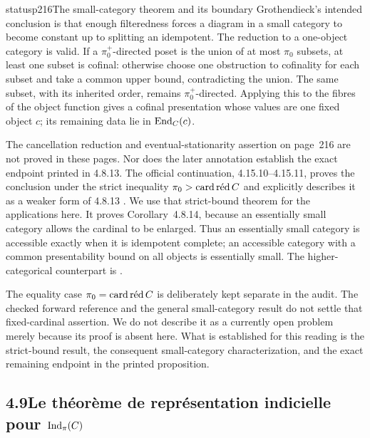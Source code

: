 
\begin{dcomment}{status}{p216}{The small-category theorem and its boundary}
Grothendieck's intended conclusion is that enough filteredness forces a diagram in a small category to become constant up to splitting an idempotent. The reduction to a one-object category is valid. If a $\pi_0^+$-directed poset is the union of at most $\pi_0$ subsets, at least one subset is cofinal: otherwise choose one obstruction to cofinality for each subset and take a common upper bound, contradicting the union. The same subset, with its inherited order, remains $\pi_0^+$-directed. Applying this to the fibres of the object function gives a cofinal presentation whose values are one fixed object $c$; its remaining data lie in $\End_C(c)$.

The cancellation reduction and eventual-stationarity assertion on page~216 are not proved in these pages. Nor does the later annotation establish the exact endpoint printed in 4.8.13. The official continuation, 4.15.10--4.15.11, proves the conclusion under the strict inequality $\pi_0>\cardred C$ and explicitly describes it as a weaker form of 4.8.13 \citep{Grothendieck1990XVIII}. We use that strict-bound theorem for the applications here. It proves Corollary~4.8.14, because an essentially small category allows the cardinal to be enlarged. Thus an essentially small category is accessible exactly when it is idempotent complete; an accessible category with a common presentability bound on all objects is essentially small. The higher-categorical counterpart is \citet[Corollaries~5.4.3.5--5.4.3.6]{Lurie2009HTT}.

The equality case $\pi_0=\cardred C$ is deliberately kept separate in the audit. The checked forward reference and the general small-category result do not settle that fixed-cardinal assertion. We do not describe it as a currently open problem merely because its proof is absent here. What is established for this reading is the strict-bound result, the consequent small-category characterization, and the exact remaining endpoint in the printed proposition.
\end{dcomment}


\subsection*{4.9\quad Le théorème de représentation indicielle pour $\Ind_{\pi}(C)$}

